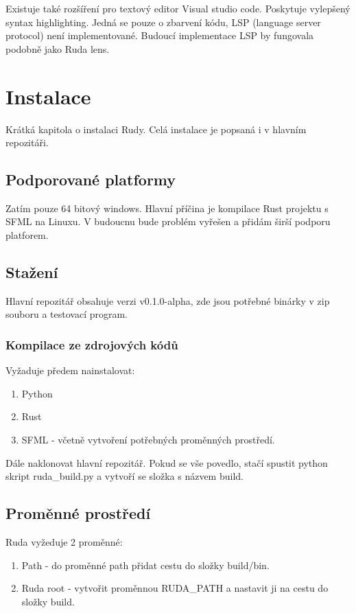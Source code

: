 \documentclass[12pt, a4paper,
twoside,        %
openright
]{report}
\let\oldchapter\chapter
\renewcommand{\chapter}{
	\clearpage
	\pagestyle{fancy}
	\oldchapter
}
\begin{document}
Existuje také rozšíření pro textový editor Visual studio code. Poskytuje vylepšený syntax highlighting. Jedná se pouze o zbarvení kódu, LSP (language server protocol) není implementované. Budoucí implementace LSP by fungovala podobně jako Ruda lens.

\chapter{Instalace}

Krátká kapitola o instalaci Rudy. Celá instalace je popsaná i v hlavním repozitáři.

\section{Podporované platformy}

Zatím pouze 64 bitový windows. Hlavní příčina je kompilace Rust projektu s SFML na Linuxu. V budoucnu bude problém vyřešen a přidám širší podporu platforem.

\section{Stažení}

Hlavní repozitář obsahuje verzi v0.1.0-alpha, zde jsou potřebné binárky v zip souboru a testovací program.

\subsection{Kompilace ze zdrojových kódů}

Vyžaduje předem nainstalovat:

\begin{enumerate}
	\item Python
	\item Rust
	\item SFML - včetně vytvoření potřebných proměnných prostředí.
\end{enumerate}

Dále naklonovat hlavní repozitář. Pokud se vše povedlo, stačí spustit python skript ruda\_build.py a vytvoří se složka s názvem build.

\section{Proměnné prostředí}

Ruda vyžeduje 2 proměnné:

\begin{enumerate}
	\item Path - do proměnné path přidat cestu do složky build/bin.
	\item Ruda root - vytvořit proměnnou RUDA\_PATH a nastavit ji na cestu do složky build.
\end{enumerate}
\end{document}
